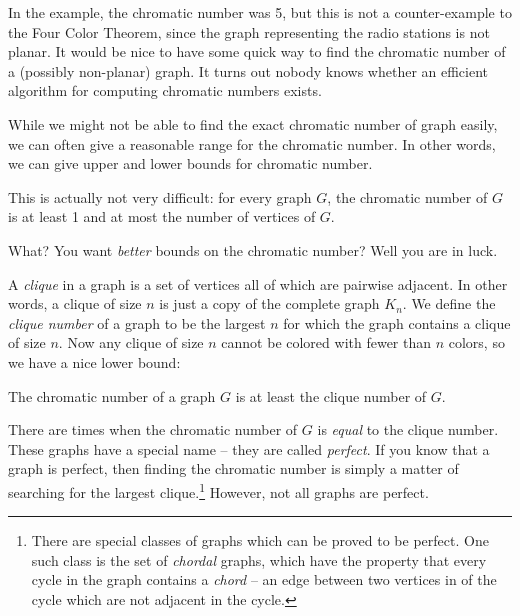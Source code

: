 \documentclass[12pt]{article}
\begin{document}
%
%

In the example, the chromatic number was 5, but this is not a counter-example to the Four Color Theorem, since the graph representing the radio stations is not planar.  It would be nice to have some quick way to find the chromatic number of a (possibly non-planar) graph.  It turns out nobody knows whether an efficient algorithm for computing chromatic numbers exists.  

While we might not be able to find the exact chromatic number of graph easily, we can often give a reasonable range for the chromatic number.  In other words, we can give upper and lower bounds for chromatic number.

This is actually not very difficult: for every graph $G$, the chromatic number of $G$ is at least 1 and at most the number of vertices of $G$.  

What?  You want \emph{better} bounds on the chromatic number?  Well you are in luck.

A \emph{clique} in a graph is a set of vertices all of which are pairwise adjacent.  In other words, a clique of size $n$ is just a copy of the complete graph $K_n$.  We define the \emph{clique number} of a graph to be the largest $n$ for which the graph contains a clique of size $n$.  Now any clique of size $n$ cannot be colored with fewer than $n$ colors, so we have a nice lower bound:

\begin{theorem}
The chromatic number of a graph $G$ is at least the clique number of $G$.
\end{theorem}

There are times when the chromatic number of $G$ is \emph{equal} to the clique number.  These graphs have a special name -- they are called \emph{perfect}.  If you know that a graph is perfect, then finding the chromatic number is simply a matter of searching for the largest clique.\footnote{There are special classes of graphs which can be proved to be perfect.  One such class is the set of \emph{chordal} graphs, which have the property that every cycle in the graph contains a \emph{chord} -- an edge between two vertices in of the cycle which are not adjacent in the cycle.}  However, not all graphs are perfect.  
\end{document}
